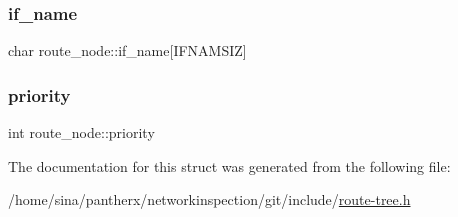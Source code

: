 \mbox{\label{structroute__node_a4be6a66a552d88f360585c636ee70680}} 
\subsubsection{\texorpdfstring{if\+\_\+name}{if\_name}}
{\footnotesize\ttfamily char route\+\_\+node\+::if\+\_\+name\mbox{[}I\+F\+N\+A\+M\+S\+IZ\mbox{]}}

\mbox{\label{structroute__node_a43cbb1b4e49fd4a12395fa28a9febecc}} 
\subsubsection{\texorpdfstring{priority}{priority}}
{\footnotesize\ttfamily int route\+\_\+node\+::priority}



The documentation for this struct was generated from the following file\+:\begin{DoxyCompactItemize}
\item 
/home/sina/pantherx/networkinspection/git/include/\hyperlink{route-tree_8h}{route-\/tree.\+h}\end{DoxyCompactItemize}
